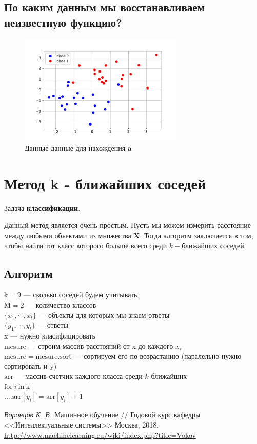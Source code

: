 \documentclass[12pt, twoside]{article}
\begin{document}
\subsection{По каким данным мы восстанавливаем неизвестную функцию?}
\begin{figure}[h!t]\center
\includegraphics[width=0.7\textwidth]{Lecture_2_class.pdf}
\caption{Данные данные для нахождения $\textbf{a}$}
\label{Lecture_2_class}
\end{figure}

\section{Метод k - ближайших соседей}
 \begin{center}
Задача {\bf классификации}.
 \end{center}

Данный метод является очень простым. Пусть мы можем измерить расстояние между любыми объектами из множества $\textbf{X}$. Тогда алгоритм заключается в том, чтобы найти тот класс которого больше всего среди $k-$ближайших соседей.

\subsection{Алгоритм}

$\text{k} = 9$ --- сколько соседей будем учитывать\\
$\text{M} = 2$ --- количество классов\\
$\{x_1, \cdots, x_l\}$ --- объекты для которых мы знаем ответы\\
$\{y_1, \cdots, y_l\}$ --- ответы\\
$\text{x}$ --- нужно класифицировать\\
$\text{mesure}$ ---  строим массив расстояний от x до каждого $x_i$\\
$\text{mesure} = \text{mesure}.\text{sort}$ ---  сортируем его по возрастанию (паралельно нужно сортировать и $\text{y}$)\\
$\text{arr}$ --- массив счетчик каждого класса среди $k$ ближайших\\
$\text{for}~i~\text{in}~\text{k}$\\
$....\text{arr}[y_i] = \text{arr}[y_i]  + 1$ 



\begin{thebibliography}{99}
	\textit{Воронцов К. В.} Машинное обучение // Годовой курс кафедры <<Интеллектуальные системы>> Москва, 2018.
	\url{http://www.machinelearning.ru/wiki/index.php?title=Vokov}
\end{thebibliography}
\end{document}
